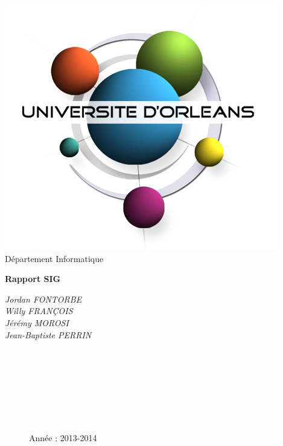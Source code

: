 \documentclass[12pt,a4paper,oneside]{article}
\begin{document}
\begin{titlepage}
\begin{flushright}
           \includegraphics[scale=0.30]{../images/univorleans.png}\\ 
                      Département Informatique
\end{flushright}
\vspace{30mm}
\begin{center}
\textbf{\huge{Rapport SIG }}\\
\vspace{8mm}
\begin{large}
	\textit{Jordan FONTORBE}\\
	\textit{Willy FRANÇOIS}\\
	\textit{Jérémy MOROSI}\\
	\textit{Jean-Baptiste PERRIN}
\end{large}

\end{center}
\begin{figure}[b!]
\begin{flushright}
~~\\ ~~\\ ~~\\ ~~\\ ~~\\ ~~\\ ~~\\
\large{Année : 2013-2014}
\end{flushright}
\end{figure}
\end{titlepage}
\end{document}
